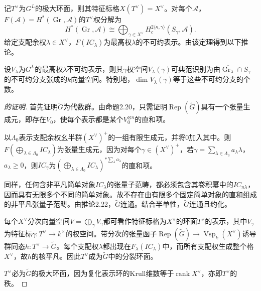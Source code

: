 记$T^\vee$为$G^L$的极大环面，则其特征标格$X(T^\vee)=X^\vee$。对每个$\mathcal A$，$F(\mathcal A)=H^*(\operatorname{Gr},\mathcal A)$的$T^\vee$权分解为
\[H^*(\operatorname{Gr},\mathcal A)\cong\bigoplus_{\gamma\in X^\vee}H_c^{2\langle\kappa,\gamma\rangle}(S_\gamma,\mathcal A).\]
给定支配余权$\lambda\in X^\vee$，$F(IC_\lambda)$为最高权$\lambda$的不可约表示。由该定理得到以下推论。
\begin{corollary}\label{L23S3O4}
设$V_\lambda$为$G^L$的最高权$\lambda$不可约表示，则其$\gamma$权空间$V_\lambda(\gamma)$可典范识别为由$\overline{\operatorname{Gr}_\lambda}\cap S_\gamma$的不可约分支张成的$k$向量空间。特别地，$\dim V_\lambda(\gamma)$等于这些不可约分支的个数。
\end{corollary}
\begin{proof}[的证明]
首先证明$\widetilde G$为代数群。由命题2.20，只需证明$\operatorname{Rep}(\widetilde G)$具有一个张量生成元，即存在$V_0$，使每个表示都是某个$V_0^{\otimes n}$的直和项。

以$\Lambda_0$表示支配余权幺半群$(X^\vee)^+$的一组有限生成元，并将$0$加入其中。则$F(\bigoplus_{\lambda\in\Lambda_0}IC_\lambda)$为张量生成元，因为对每个$\gamma\in(X^\vee)^+$，若$\gamma=\sum_{\lambda\in\Lambda_0}a_\lambda\lambda$，$a_\lambda\ge0$，则$IC_\gamma$为$(\bigoplus_{\lambda\in\Lambda_0}IC_\lambda)^{*\sum_\lambda a_\lambda}$的直和项。

同样，任何含非平凡简单对象$IC_\lambda$的张量子范畴，都必须包含其卷积幂中的$IC_{n\lambda}$，因而具有无限多个不同的简单对象。故不存在由有限多个固定简单对象的直和组成的非平凡张量子范畴。由推论2.22，$\widetilde G$连通。结合半单性，$\widetilde G$连通且约化。

每个$X^\vee$分次向量空间$V=\bigoplus_\gamma V_\gamma$都可看作特征标格为$X^\vee$的环面$T^\vee$的表示，其中$V_\gamma$为特征标$\gamma:T^\vee\to k^\times$的权空间。带分次的张量函子$\operatorname{Rep}(\widetilde G)\to\operatorname{Vsp}_k(X^\vee)$诱导群同态$h:T^\vee\to\widetilde G$。每个支配权$\lambda$都出现在$F_\lambda(IC_\lambda)$中，而所有支配权生成整个格$X^\vee$，故$h$的核平凡。因此$T^\vee$成为$\widetilde G$中的分裂环面。

$T^\vee$必为$\widetilde G$的极大环面，因为复化表示环的Krull维数等于$\operatorname{rank}X^\vee$，亦即$T^\vee$的秩。


\end{proof}
